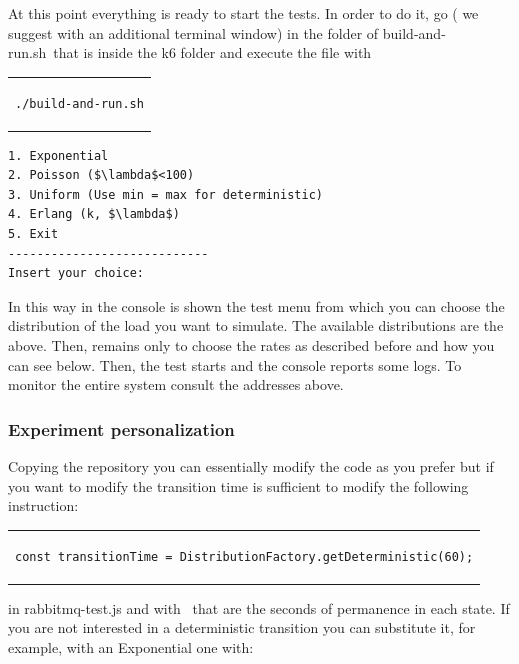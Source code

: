 At this point everything is ready to start the tests. In order to do it, go ( we suggest with an additional terminal window) in the folder of \guillemotleft build-and-run.sh\guillemotright \ that is inside the \guillemotleft k6 \guillemotright folder and execute the file with
\begin{table}[!htb]
\centering
\begin{tabular}{c}
\begin{lstlisting}
./build-and-run.sh
\end{lstlisting}
\end{tabular}
\end{table}

\begin{lstlisting}[mathescape]
1. Exponential
2. Poisson ($\lambda$<100)
3. Uniform (Use min = max for deterministic)
4. Erlang (k, $\lambda$)
5. Exit
----------------------------
Insert your choice:
\end{lstlisting}

In this way in the console is shown the test menu from which you can choose the distribution of the load you want to simulate. The available distributions are the above. Then, remains only to choose the rates as described before and how you can see below. Then, the test starts and the console reports some logs. To monitor the entire system consult the addresses above. 

\subsubsection{Experiment personalization}

Copying the repository you can essentially modify the code as you prefer but if you want to modify the transition time is sufficient to modify the following instruction:

\begin{table}[!htb]
\centering
\begin{tabular}{c}
\begin{lstlisting}
const transitionTime = DistributionFactory.getDeterministic(60);
\end{lstlisting}
\end{tabular}
\end{table}

in rabbitmq-test.js and with \guillemotright \ that are the seconds of permanence in each state. If you are not interested in a deterministic transition you can substitute it, for example, with an Exponential one with:

